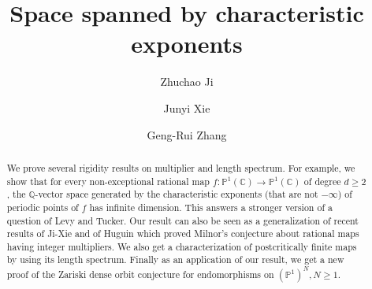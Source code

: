 \documentclass[12pt]{amsart}
\theoremstyle{plain}
\theoremstyle{remark}
\theoremstyle{definition}
\def\Q{\mathbb Q}
\def\C{\mathbb C}
\def\P{\mathbb P}
\begin{document}
\title[]{Space spanned by characteristic exponents}

\author{Zhuchao Ji}

\address{Institute for Theoretical Sciences, Westlake University, Hangzhou 310030, China}


\author{Junyi Xie}

\address{Beijing International Center for Mathematical Research, Peking University, Beijing 100871, China}




\author{Geng-Rui Zhang}

\address{School of Mathematical Sciences, Peking University, Beijing 100871, China}









\maketitle



\begin{abstract}
We prove several rigidity results on multiplier and length spectrum. 
For example, we show that for every non-exceptional rational map $f:\P^1(\C)\to\P^1(\C)$ of degree $d\geq2$, the $\Q$-vector space generated by the characteristic exponents (that are not $-\infty$) of periodic points of $f$ has infinite dimension.  This  answers a stronger version of a question of Levy and Tucker. Our result can  also be seen as a generalization of  recent results of Ji-Xie and of Huguin which proved Milnor's conjecture about rational maps having integer multipliers.  
We also get a characterization of postcritically finite maps by using its length spectrum.
Finally as an application of our result, we get a new proof of the Zariski dense orbit conjecture for endomorphisms on $(\P^1)^N, N\geq 1$. 
\end{abstract}
\end{document}
